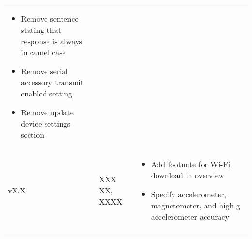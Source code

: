 \begin{longtable}{| >{\centering}p{} | p{} | >{\raggedright\arraybackslash}p{} |}
\begin{itemize}
			\item Remove sentence stating that response is always in camel case
            \item Remove serial accessory transmit enabled setting
            \item Remove update device settings section
        \end{itemize}\\
        vX.X & XXX XX, XXXX &
        \begin{itemize}
			\item Add footnote for Wi-Fi download in overview
			\item Specify accelerometer, magnetometer, and high-g accelerometer accuracy
        \end{itemize}\\
        \arrayrulecolor{gray!50}\hline
    \end{longtable}
\endgroup
